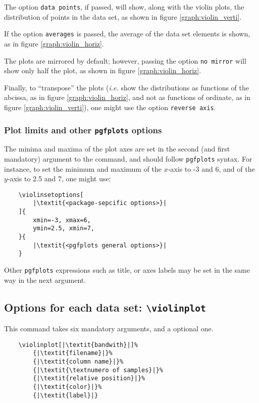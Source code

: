 \documentclass{article}
\begin{document}
The option \texttt{data points}, if passed, will show, along with
the violin plots, the distribution of points in the data set, as shown in
figure \ref{graph:violin_verti}.

If the option \texttt{averages} is passed, the average of the data set
elements is shown, as in figure \ref{graph:violin_horiz}.

The plots are mirrored by default; however, passing the option \texttt{no mirror}
will show only half the plot, as shown in figure \ref{graph:violin_horiz}.

Finally, to ``transpose'' the plots (\textit{i.e.} show the distributions
as functions of the abcissa, as in figure \ref{graph:violin_horiz},
and not as functions of ordinate, as in figure \ref{graph:violin_verti}),
one might use the option \texttt{reverse axis}.

\subsubsection{Plot limits and other \texttt{pgfplots} options}

The minima and maxima of the plot axes are set in the second (and first
mandatory) argument to the command, and should follow \texttt{pgfplots}
syntax. For instance, to set the minimum and maximum of the $x$-axis
to -3 and 6, and of the $y$-axis to 2.5 and 7, one might use:

\begin{verbatim}
	\violinsetoptions[
		|\textit{<package-sepcific options>}|
	]{
		xmin=-3, xmax=6,
		ymin=2.5, xmin=7,
	}{
		|\textit{<pgfplots general options>}|
	}
\end{verbatim}

Other \texttt{pgfplots} expressions such as title, or axes labels may be set
in the same way in the next argument.

\subsection{Options for each data set: \texttt{{\textbackslash}violinplot}}

This command takes six mandatory arguments, and a optional one.
\begin{verbatim}
	\violinplot[|\textit{bandwith}|]%
		{|\textit{filename}|}%
		{|\textit{column name}|}%
		{|\textit{\textnumero of samples}|}%
		{|\textit{relative position}|}%
		{|\textit{color}|}%
		{|\textit{label}|}
\end{verbatim}
\end{document}
